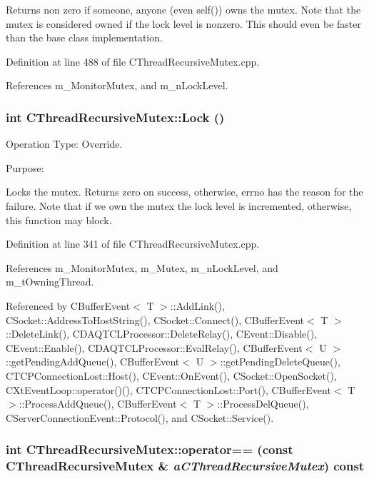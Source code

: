 Returns non zero if someone, anyone (even self()) owns the mutex. Note that the mutex is considered owned if the lock level is  nonzero. This should even be faster than the base class  implementation. 

Definition at line 488 of file CThread\-Recursive\-Mutex.cpp.

References m\_\-Monitor\-Mutex, and m\_\-n\-Lock\-Level.
\subsubsection{\setlength{\rightskip}{0pt plus 5cm}int CThread\-Recursive\-Mutex::Lock ()}\label{classCThreadRecursiveMutex_a6}


Operation Type: Override.

Purpose:

Locks the mutex. Returns zero on success, otherwise, errno has the reason for the failure. Note that if we own the mutex the lock level is incremented, otherwise, this function may block. 

Definition at line 341 of file CThread\-Recursive\-Mutex.cpp.

References m\_\-Monitor\-Mutex, m\_\-Mutex, m\_\-n\-Lock\-Level, and m\_\-t\-Owning\-Thread.

Referenced by CBuffer\-Event$<$ T $>$::Add\-Link(), CSocket::Address\-To\-Host\-String(), CSocket::Connect(), CBuffer\-Event$<$ T $>$::Delete\-Link(), CDAQTCLProcessor::Delete\-Relay(), CEvent::Disable(), CEvent::Enable(), CDAQTCLProcessor::Eval\-Relay(), CBuffer\-Event$<$ U $>$::get\-Pending\-Add\-Queue(), CBuffer\-Event$<$ U $>$::get\-Pending\-Delete\-Queue(), CTCPConnection\-Lost::Host(), CEvent::On\-Event(), CSocket::Open\-Socket(), CXt\-Event\-Loop::operator()(), CTCPConnection\-Lost::Port(), CBuffer\-Event$<$ T $>$::Process\-Add\-Queue(), CBuffer\-Event$<$ T $>$::Process\-Del\-Queue(), CServer\-Connection\-Event::Protocol(), and CSocket::Service().
\subsubsection{\setlength{\rightskip}{0pt plus 5cm}int CThread\-Recursive\-Mutex::operator== (const CThread\-Recursive\-Mutex \& {\em a\-CThread\-Recursive\-Mutex}) const\hspace{0.3cm}{\tt  [private]}}\label{classCThreadRecursiveMutex_c1}



